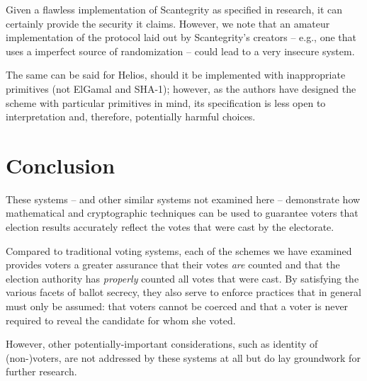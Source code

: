 \documentclass[10pt,twocolumn]{article}
\begin{document}
Given a flawless implementation of Scantegrity as specified in research, it can certainly provide the
security it claims. However, we note that an amateur implementation of the protocol laid out by
Scantegrity's creators -- e.g., one that uses a imperfect source of randomization -- could lead to a
very insecure system.

The same can be said for Helios, should it be implemented with inappropriate primitives (not ElGamal
and SHA-1); however, as the authors have designed the scheme with particular primitives in mind, its
specification is less open to interpretation and, therefore, potentially harmful choices.

\section{Conclusion}

These systems -- and other similar systems not examined here -- demonstrate how mathematical and
cryptographic techniques can be used to guarantee voters that election results accurately reflect
the votes that were cast by the electorate.

Compared to traditional voting systems, each of the schemes we have examined provides voters a
greater assurance that their votes \emph{are} counted and that the election authority has
\emph{properly} counted all votes that were cast. By satisfying the various facets of ballot
secrecy, they also serve to enforce practices that in general must only be assumed: that voters
cannot be coerced and that a voter is never required to reveal the candidate for whom she voted.

However, other potentially-important considerations, such as identity of (non-)voters, are not
addressed by these systems at all but do lay groundwork for further research.



\end{document}
